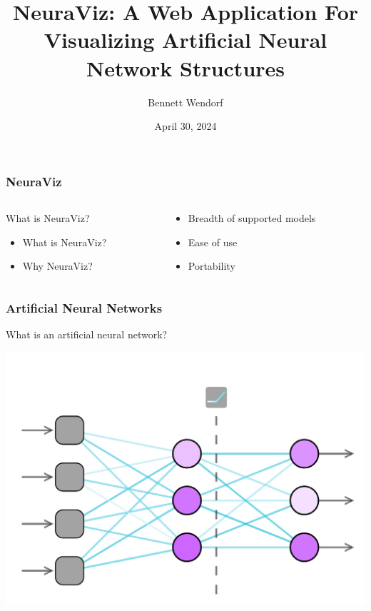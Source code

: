 \documentclass{beamer}
\title{NeuraViz: A Web Application For Visualizing Artificial Neural Network Structures}
\author{Bennett Wendorf}
\institute{University of Wisconsin - La Crosse}
\date{April 30, 2024}
\begin{document}
 
\frame{\titlepage}


\begin{frame}
    \frametitle{NeuraViz}
    \begin{columns}
        \begin{column}{0.5\textwidth}
            \begin{block}{What is NeuraViz?}
                \begin{itemize}
                    \item What is NeuraViz? \pause
                    \item Why NeuraViz?
                \end{itemize}
            \end{block}
        \end{column}
        \pause
        \begin{column}{0.5\textwidth}
            \begin{itemize}
                \item Breadth of supported models \pause
                \item Ease of use \pause
                \item Portability
            \end{itemize}
        \end{column}
    \end{columns}
\end{frame}

\begin{frame}
    \frametitle{Artificial Neural Networks}
    \begin{block}{}
        What is an artificial neural network?
    \end{block}
    \pause
    \centering
    \includegraphics[scale=0.18]{../01_introduction/res/neural_network.png}
\end{frame}
    
\end{document}
